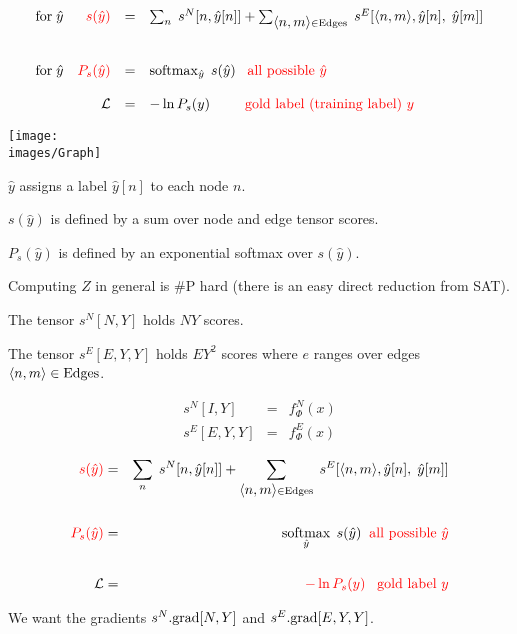 {

{\huge
$$\begin{array}{lrcl}
\mbox{for}\;\hat{y} & {\color{red} s(\hat{y})} & = & \sum_n\;s^N[n,\hat{y}[n]] + \sum_{{\mbox{$\langle n,m\rangle$}} \in \mathrm{Edges}}\;s^E[{\mbox{$\langle n,m\rangle$}},\hat{y}[n],\;\hat{y}[m]] \\
\\
\\
\mbox{for}\;\hat{y} & {\color{red} P_s(\hat{y})} & = & \operatorname*{softmax}_{\hat{y}}\;s(\hat{y}) \;\;\;\mbox{\color{red} all possible $\hat{y}$} \\
\\
 & {\cal L} & = & - \ln P_s(y) \;\;\;{\color{red} \;\;\;\;\;\;\mbox{gold label (training label) $y$}}
\end{array}$$
}

\centerline{\texttt{[image: \\images/Graph]}}
\medskip
$\hat{y} $ assigns a label $\hat{y}[n]$ to each node $n$.

\vfill
$s(\hat{y})$ is defined by a sum over node and edge tensor scores.

\vfill
$P_s(\hat{y})$ is defined by an exponential softmax over $s(\hat{y})$.

\vfill
Computing $Z$ in general is \#P hard (there is an easy direct reduction from SAT).


The tensor {\color{red} $s^N[N,Y]$} holds $NY$ scores.

\vfill
The tensor {\color{red} $s^E[E,Y,Y]$} holds $EY^2$ scores where $e$ ranges over edges ${\mbox{$\langle n,m\rangle$}} \in \mathrm{Edges}$.


\begin{eqnarray*}
s^N[I,Y] & = & f^N_\Phi(x) \\
s^E[E,Y,Y] & = & f^E_\Phi(x)
\end{eqnarray*}

\vfill
\begin{eqnarray*}
{\color{red} s(\hat{y})} & = & \sum_n\;s^N[n,\hat{y}[n]] + \sum_{{\mbox{$\langle n,m\rangle$}} \in \mathrm{Edges}}\;s^E[{\mbox{$\langle n,m\rangle$}},\hat{y}[n],\;\hat{y}[m]] \\
\\
{\color{red} P_s(\hat{y})} & = & \operatorname*{softmax}_{\hat{y}}\;s(\hat{y}) \;\;\mbox{\color{red} all possible $\hat{y}$} \\
\\
{\cal L} & = & {\color{red} - \ln P_s(y) \;\;\;\mbox{gold label $y$}}
\end{eqnarray*}

\vfill
We want the gradients {\color{red} $s^N.\mathrm{grad}[N,Y]$} and {\color{red} $s^E.\mathrm{grad}[E,Y,Y]$}.



}


